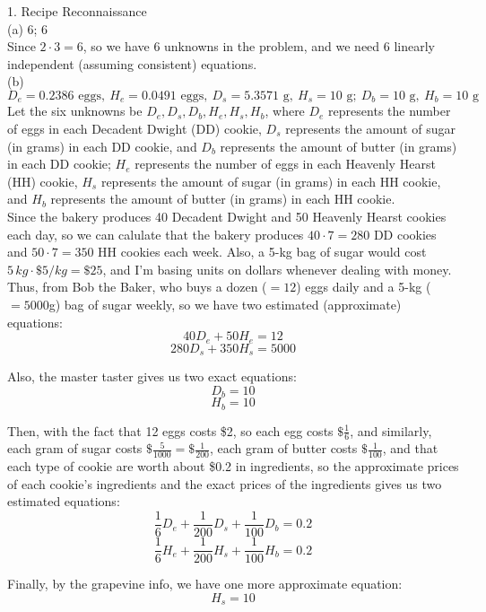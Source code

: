 \documentclass{article}
\begin{document}
{\Large 1. Recipe Reconnaissance} \\[.5cm]
{\color{red} (a) 6; 6} \\

Since $2\cdot3 = 6$, so we have 6 unknowns in the problem, and we need 6 linearly independent (assuming consistent) equations. \\[.5cm]
{\color{red} (b)
$D_e = 0.2386 \text{ eggs},\
H_e = 0.0491 \text{ eggs},\
D_s = 5.3571 \text{ g},\
H_s = 10 \text{ g};\
D_b = 10 \text{ g},\
H_b = 10 \text{ g}$} \\

Let the six unknowns be $D_e, D_s, D_b, H_e, H_s, H_b$, where $D_e$ represents the number of eggs in each Decadent Dwight (DD) cookie, $D_s$ represents the amount of sugar (in grams) in each DD cookie, and $D_b$ represents the amount of butter (in grams) in each DD cookie; $H_e$ represents the number of eggs in each Heavenly Hearst (HH) cookie, $H_s$ represents the amount of sugar (in grams) in each HH cookie, and $H_b$ represents the amount of butter (in grams) in each HH cookie. \\

Since the bakery produces 40 Decadent Dwight and 50 Heavenly Hearst cookies each day, so we can calulate that the bakery produces $40\cdot7 = 280$ DD cookies and $50\cdot7 = 350$ HH cookies each week. Also, a 5-kg bag of sugar would cost $5\,kg\cdot\$5/kg = \$25$, and I'm basing units on dollars whenever dealing with money.
\\

Thus, from Bob the Baker, who buys a dozen ($=12$) eggs daily and a 5-kg ($=5000$g) bag of sugar weekly, so we have two {\color{blue} estimated} (approximate) equations:
$$40 D_e + 50 H_e = 12$$
$$280 D_s + 350 H_s = 5000$$

Also, the master taster gives us two {\color{blue} exact} equations:
$$D_b = 10$$
$$H_b = 10$$

Then, with the fact that
12 eggs costs \$2, so each egg costs $\$\frac{1}{6}$,
and similarly, each gram of sugar costs $\$\frac{5}{1000} = \$\frac{1}{200}$,
each gram of butter costs $\$\frac{1}{100}$,
and that each type of cookie are worth about \$0.2 in ingredients,
so the approximate prices of each cookie's ingredients and the exact prices of the ingredients gives us two {\color{blue} estimated} equations:
$$\frac{1}{6}D_e + \frac{1}{200}D_s + \frac{1}{100}D_b = 0.2$$
$$\frac{1}{6}H_e + \frac{1}{200}H_s + \frac{1}{100}H_b = 0.2$$

Finally, by the grapevine info, we have one more {\color{blue} approximate} equation:
$$H_s = 10$$ \\
\end{document}
